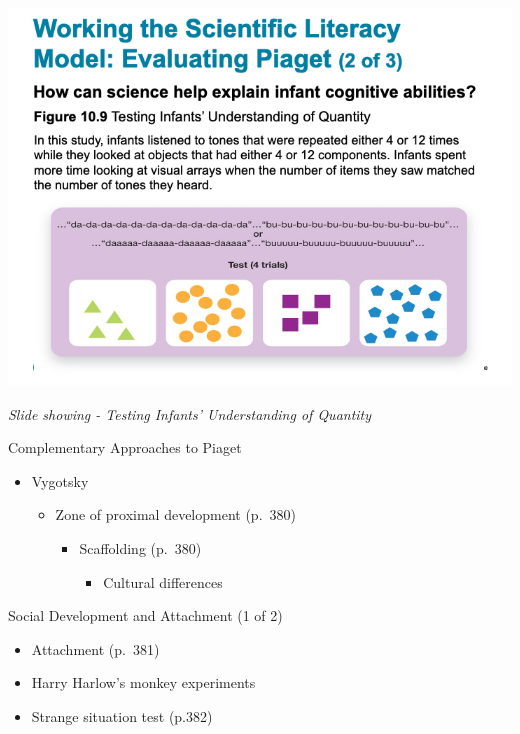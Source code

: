 \documentclass[
]{book}
\providecommand{\tightlist}{%
  \setlength{\itemsep}{0pt}\setlength{\parskip}{0pt}}
\begin{document}
\begin{reflect}
\includegraphics{assets/unit_3/slide_31.png}

\emph{Slide showing - Testing Infants' Understanding of Quantity}

Complementary Approaches to Piaget

\begin{itemize}
\tightlist
\item
  Vygotsky

  \begin{itemize}
  \tightlist
  \item
    Zone of proximal development (p.~380)

    \begin{itemize}
    \tightlist
    \item
      Scaffolding (p.~380)

      \begin{itemize}
      \tightlist
      \item
        Cultural differences
      \end{itemize}
    \end{itemize}
  \end{itemize}
\end{itemize}

Social Development and Attachment (1 of 2)

\begin{itemize}
\tightlist
\item
  Attachment (p.~381)\\
\item
  Harry Harlow's monkey experiments\\
\item
  Strange situation test (p.382)
\end{itemize}


\end{reflect}
\end{document}
